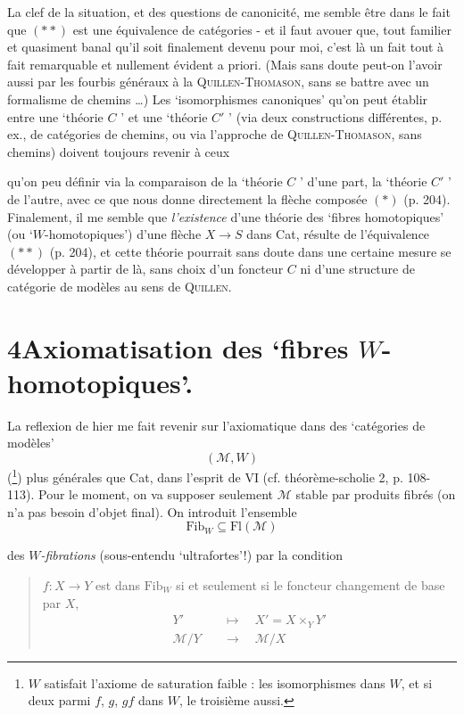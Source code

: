 \documentclass[11pt]{article}
\newcommand{\msp}[1]{\marginpar{\raggedright\scriptsize ms.~#1}}
\begin{document}
{\reversemarginpar\marginnote{$\|$}}%
La clef de la situation, et des questions de canonicité, me semble être dans le fait que $(**)$ est une équivalence de catégories - et il faut avouer que, tout familier et quasiment banal qu'il soit finalement devenu pour moi, c'est là un fait tout à fait remarquable et nullement évident a priori. (Mais sans doute peut-on l'avoir aussi par les fourbis généraux à la \textsc{Quillen-Thomason}, sans se battre avec un formalisme de chemins \dots) Les ‘isomorphismes canoniques’ qu'on peut établir entre une ‘théorie $C$ ’ et une ‘théorie $C'$ ’ (via deux constructions différentes, p. ex., de catégories de chemins, ou via l'approche de \textsc{Quillen-Thomason}, sans chemins) doivent toujours revenir à ceux

\msp{page 207}qu'on peu définir via la comparaison de la ‘théorie $C$ ’ d'une part, la ‘théorie $C'$ ’ de l'autre, avec ce que nous donne directement la flèche composée $(*)$ (p. 204). Finalement, il me semble que \textit{l'existence} d'une théorie des ‘fibres homotopiques’ (ou ‘$W$-homotopiques’) d'une flèche $X \longrightarrow S$ dans Cat, résulte de l'équivalence $(**)$ (p. 204), et cette théorie pourrait sans doute dans une certaine mesure se développer à partir de là, sans choix d'un foncteur $C$ ni d'une structure de catégorie de modèles au sens de \textsc{Quillen}. %

\section*{4\quad Axiomatisation des ‘fibres $W$-homotopiques’.}

La reflexion de hier me fait revenir sur l'axiomatique dans des ‘catégories de modèles’ %
\[
(\mathcal{M}, W)
\]
(\footnote[119]{$W$ satisfait l'axiome de saturation faible : les isomorphismes dans $W$, et si deux parmi $f$, $g$, $gf$ dans $W$, le troisième aussi.}) plus générales que Cat, dans l'esprit de VI (cf. théorème-scholie 2, p. 108-113). Pour le moment, on va supposer seulement $\mathcal{M}$ stable par produits fibrés (on n'a pas besoin d'objet final). On introduit l'ensemble
\[
\mathrm{Fib}_W \subseteq \mathrm{Fl}(\mathcal{M})
\]

\msp{page 208}des \textit{$W$-fibrations} (sous-entendu ‘ultrafortes’!) par la condition

\begin{quote}
$f : X \longrightarrow Y$ est dans $\mathrm{Fib}_W$ si et seulement si le foncteur changement de base par $X$,
\[
\begin{aligned}
Y' &\quad\longmapsto\quad X' = X \times_Y Y' \\
\mathcal{M}/Y &\quad\longrightarrow\quad \mathcal{M}/X
\end{aligned}
\]
\end{quote}
\end{document}
